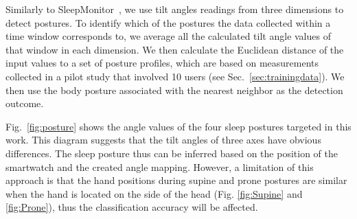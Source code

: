 

Similarly to SleepMonitor~\cite{sleepmonitor}, we use tilt angles readings from three dimensions to detect postures. To identify which of the postures the data collected within a time window corresponds to, we average all the calculated tilt angle values of that window in each dimension. We then calculate the Euclidean distance of the input values to a set of posture profiles, which are based on measurements collected in a pilot study that involved 10 users (see Sec.~\ref{sec:trainingdata}). We then use the body posture associated with the nearest neighbor as the detection outcome.






Fig.~\ref{fig:posture} shows the angle values of the four sleep postures targeted in this work. This diagram suggests that the tilt angles
of three axes have obvious differences. The sleep posture thus can be inferred based on the position of the smartwatch and the created
angle mapping. However, a limitation of this approach is that the hand positions during supine and prone postures are similar when the hand
is located on the side of the head (Fig. \ref{fig:Supine} and \ref{fig:Prone}), thus the classification accuracy will be affected.

